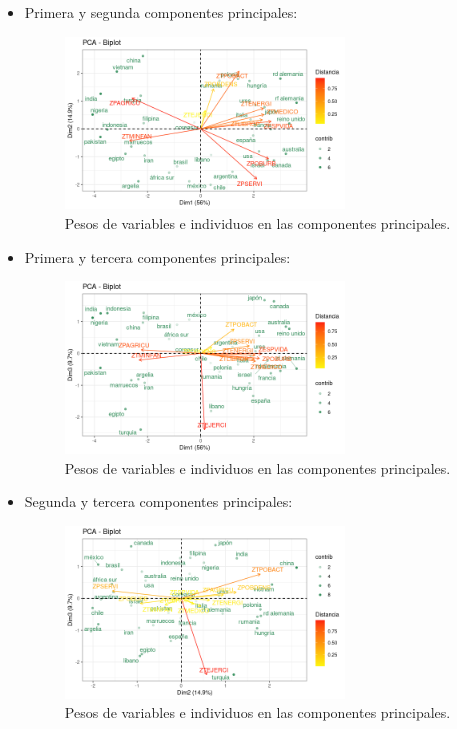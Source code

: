 \documentclass[11pt,a4paper]{article}
\begin{document}
	\begin{itemize}
	\item Primera y segunda componentes principales:	
	\begin{figure}[H]
		\centering
		\includegraphics[width=0.7\textwidth]{images/vis_pca1}
		\caption{Pesos de variables e individuos en las componentes principales.}
	\end{figure}
	\item Primera y tercera componentes principales:
	\begin{figure}[H]
		\centering
		\includegraphics[width=0.7\textwidth]{images/vis_pca2}
		\caption{Pesos de variables e individuos en las componentes principales.}
	\end{figure}
	\item Segunda y tercera componentes principales:
	\begin{figure}[H]
		\centering
		\includegraphics[width=0.7\textwidth]{images/vis_pca3}
		\caption{Pesos de variables e individuos en las componentes principales.}
	\end{figure}
	\end{itemize}
	
\end{document}
